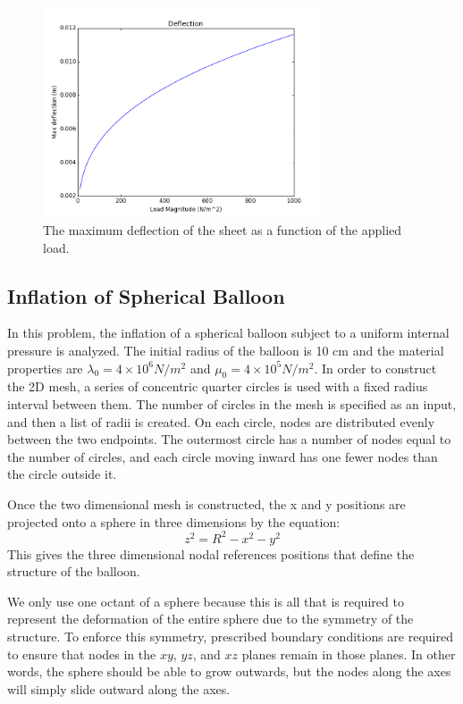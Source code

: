 \documentclass[]{spie}  %
\begin{document}
\begin{figure}[h]
	\centering
	\includegraphics[width=3.25in]{load_vs_deflection.png}
	\caption{The maximum deflection of the sheet as a function of the applied load.} 
	\label{fig: load vs deflection}
\end{figure}

\subsection{Inflation of Spherical Balloon}
In this problem, the inflation of a spherical balloon subject to a uniform internal pressure is analyzed. The initial radius of the balloon is 10 cm and the material properties are $\lambda_0 = 4 \times 10^6 N/m^2$ and $\mu_0 = 4 \times 10^5 N/m^2$. In order to construct the 2D mesh, a series of concentric quarter circles is used with a fixed radius interval between them. The number of circles in the mesh is specified as an input, and then a list of radii is created. On each circle, nodes are distributed evenly between the two endpoints. The outermost circle has a number of nodes equal to the number of circles, and each circle moving inward has one fewer nodes than the circle outside it. 

Once the two dimensional mesh is constructed, the x and y positions are projected onto a sphere in three dimensions by the equation:
\begin{equation}
z^2 = R^2 - x^2 - y^2
\end{equation}
This gives the three dimensional nodal references positions that define the structure of the balloon.

We only use one octant of a sphere because this is all that is required to represent the deformation of the entire sphere due to the symmetry of the structure. To enforce this symmetry, prescribed boundary conditions are required to ensure that nodes in the $xy$, $yz$, and $xz$ planes remain in those planes. In other words, the sphere should be able to grow outwards, but the nodes along the axes will simply slide outward along the axes. 
\end{document}
